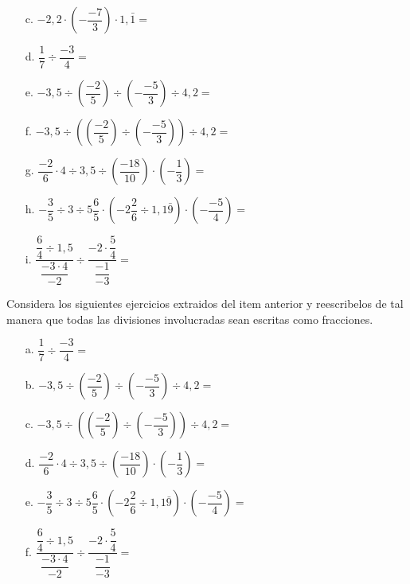 \documentclass[spanish,letterpaper, 11pt, addpoints, answers]{exam}
\begin{document}
\begin{questions}
\begin{multicols}{2}
\begin{itemize}
\item[c.] $-2{,}2\cdot \left(-\dfrac{-7}{3}\right)\cdot 1{,}\bar{1}=$

\item[d.] $\dfrac{1}{7}\div \dfrac{-3}{4}=$

\item[e.] $-3{,}5\div \left(\dfrac{-2}{5}\right)\div \left(-\dfrac{-5}{3}\right)\div 4{,}2=$

\item[f.] $-3{,}5\div \left(\left(\dfrac{-2}{5}\right)\div \left(-\dfrac{-5}{3}\right)\right)\div 4{,}2=$

\item[g.] $\dfrac{-2}{6}\cdot 4\div 3{,}5\div \left(\dfrac{-18}{10}\right)\cdot \left(-\dfrac{1}{3}\right)=$

\item[h.] $-\dfrac{3}{5}\div 3\div 5\dfrac{6}{5}\cdot \left(-2\dfrac{2}{6}\div1{,}1\bar{9}\right)\cdot \left(-\dfrac{-5}{4}\right)=$

\item[i.] $\dfrac{\dfrac{6}{4}\div 1{,}5}{\dfrac{-3\cdot 4}{-2}}\div\dfrac{-2\cdot \dfrac{5}{4}}{\dfrac{-1}{-3}}=$

\end{itemize}

\end{multicols}
\question Considera los siguientes ejercicios extraidos del item anterior y reescribelos de tal manera que todas las divisiones involucradas sean escritas como fracciones.

\begin{itemize}
  \item[a.] $\dfrac{1}{7}\div \dfrac{-3}{4}=$

  \item[b.] $-3{,}5\div \left(\dfrac{-2}{5}\right)\div \left(-\dfrac{-5}{3}\right)\div 4{,}2=$

  \item[c.] $-3{,}5\div \left(\left(\dfrac{-2}{5}\right)\div \left(-\dfrac{-5}{3}\right)\right)\div 4{,}2=$

  \item[d.] $\dfrac{-2}{6}\cdot 4\div 3{,}5\div \left(\dfrac{-18}{10}\right)\cdot \left(-\dfrac{1}{3}\right)=$

  \item[e.] $-\dfrac{3}{5}\div 3\div 5\dfrac{6}{5}\cdot \left(-2\dfrac{2}{6}\div1{,}1\bar{9}\right)\cdot \left(-\dfrac{-5}{4}\right)=$

  \item[f.] $\dfrac{\dfrac{6}{4}\div 1{,}5}{\dfrac{-3\cdot 4}{-2}}\div\dfrac{-2\cdot \dfrac{5}{4}}{\dfrac{-1}{-3}}=$


\end{itemize}
\end{questions}
\end{document}
